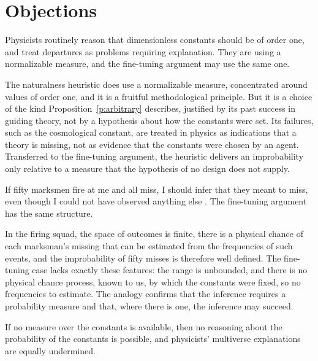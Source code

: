 \documentclass{situationist-preprint}
\begin{document}
\section{Objections}

\begin{objection}[Naturalness]
Physicists routinely reason that dimensionless constants should be of order one, and treat departures as problems requiring explanation. They are using a normalizable measure, and the fine-tuning argument may use the same one.
\end{objection}

\begin{reply}
The naturalness heuristic does use a normalizable measure, concentrated around values of order one, and it is a fruitful methodological principle. But it is a choice of the kind Proposition~\ref{p:arbitrary} describes, justified by its past success in guiding theory, not by a hypothesis about how the constants were set. Its failures, such as the cosmological constant, are treated in physics as indications that a theory is missing, not as evidence that the constants were chosen by an agent. Transferred to the fine-tuning argument, the heuristic delivers an improbability only relative to a measure that the hypothesis of no design does not supply.
\end{reply}

\begin{objection}
If fifty marksmen fire at me and all miss, I should infer that they meant to miss, even though I could not have observed anything else \citep{Leslie1989}. The fine-tuning argument has the same structure.
\end{objection}

\begin{reply}
In the firing squad, the space of outcomes is finite, there is a physical chance of each marksman's missing that can be estimated from the frequencies of such events, and the improbability of fifty misses is therefore well defined. The fine-tuning case lacks exactly these features: the range is unbounded, and there is no physical chance process, known to us, by which the constants were fixed, so no frequencies to estimate. The analogy confirms that the inference requires a probability measure and that, where there is one, the inference may succeed.
\end{reply}

\begin{objection}
If no measure over the constants is available, then no reasoning about the probability of the constants is possible, and physicists' multiverse explanations are equally undermined.
\end{objection}
\end{document}
